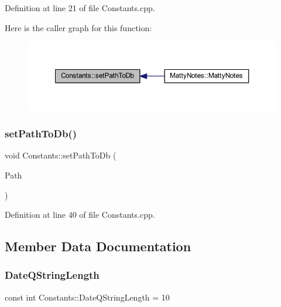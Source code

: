 Definition at line 21 of file Constants.\+cpp.

Here is the caller graph for this function\+:
\nopagebreak
\begin{figure}[H]
\begin{center}
\leavevmode
\includegraphics[width=350pt]{classConstants_a3d474cb2c4e964cb64ab6f2db6e1bf92_icgraph}
\end{center}
\end{figure}
\hypertarget{classConstants_ab9a63f6d49de9a335b18e5ac543ec0fc}{}\label{classConstants_ab9a63f6d49de9a335b18e5ac543ec0fc} 
\subsubsection{\texorpdfstring{set\+Path\+To\+Db()}{setPathToDb()}\hspace{0.1cm}{\footnotesize\ttfamily [2/2]}}
{\footnotesize\ttfamily void Constants\+::set\+Path\+To\+Db (\begin{DoxyParamCaption}\item[{Q\+String \&}]{Path }\end{DoxyParamCaption})\hspace{0.3cm}{\ttfamily [static]}}



Definition at line 40 of file Constants.\+cpp.



\subsection{Member Data Documentation}
\hypertarget{classConstants_ae5b9b8df2388680fdacc61f9c247307d}{}\label{classConstants_ae5b9b8df2388680fdacc61f9c247307d} 
\subsubsection{\texorpdfstring{Date\+Q\+String\+Length}{DateQStringLength}}
{\footnotesize\ttfamily const int Constants\+::\+Date\+Q\+String\+Length = 10\hspace{0.3cm}{\ttfamily [static]}}



